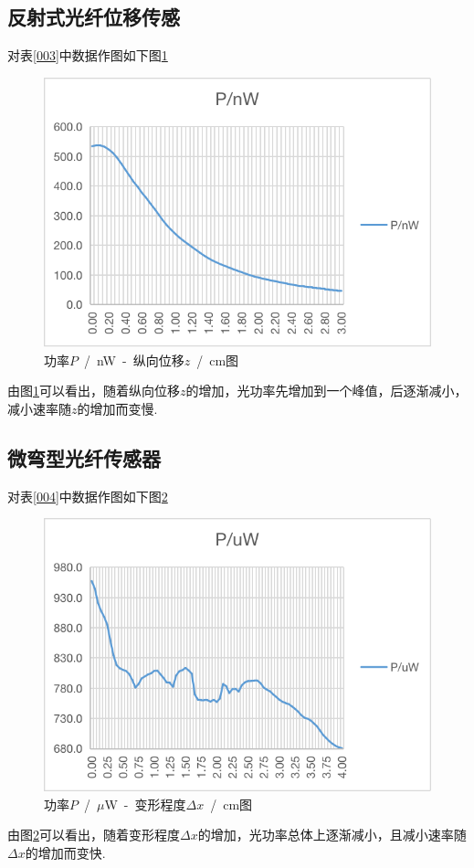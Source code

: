 \documentclass[a4paper]{article}%
\begin{document}
\subsection{反射式光纤位移传感}
对表\ref{003}中数据作图如下图\ref{00002}
\begin{figure}[H]%
  \centering%
      \includegraphics[scale=.7]{3.png}
  \caption{功率$P$~/~nW~-~纵向位移$z$~/~cm图}\label{00002}%
\end{figure}
由图\ref{00002}可以看出，随着纵向位移$z$的增加，光功率先增加到一个峰值，后逐渐减小，减小速率随$z$的增加而变慢.

\subsection{微弯型光纤传感器}
对表\ref{004}中数据作图如下图\ref{00003}
\begin{figure}[H]%
  \centering%
      \includegraphics[scale=.7]{4.png}
  \caption{功率$P$~/~$\mu$W~-~变形程度$\Delta x$~/~cm图}\label{00003}%
\end{figure}
由图\ref{00003}可以看出，随着变形程度$\Delta x$的增加，光功率总体上逐渐减小，且减小速率随$\Delta x$的增加而变快.
\end{document}
